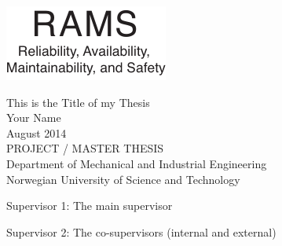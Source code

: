 
\thispagestyle{empty}
\includegraphics[scale=1.1]{fig/rams}
\mbox{}\\[6pc]
\begin{center}
\Huge{This is the Title of my Thesis}\\[2pc]

\Large{Your Name}\\[1pc]
\large{August 2014}\\[2pc]

PROJECT / MASTER THESIS\\
Department of Mechanical and Industrial Engineering\\
Norwegian University of Science and Technology
\end{center}
\vfill

\noindent Supervisor 1: The main supervisor

\noindent Supervisor 2: The co-supervisors (internal and external)

